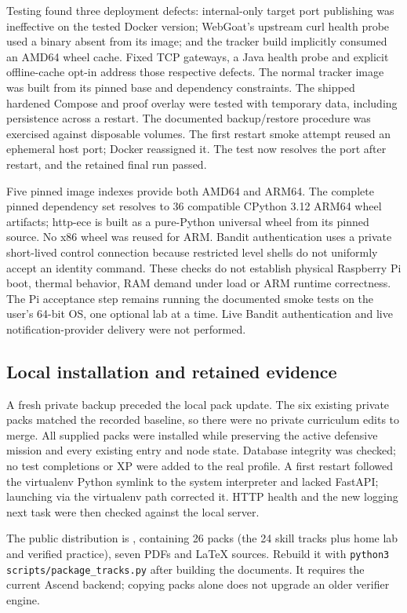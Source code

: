 Testing found three deployment defects: internal-only target port publishing was
ineffective on the tested Docker version; WebGoat's upstream curl health probe used
a binary absent from its image; and the tracker build implicitly consumed an AMD64
wheel cache. Fixed TCP gateways, a Java health probe and explicit offline-cache
opt-in address those respective defects. The normal tracker image was built from
its pinned base and dependency constraints. The shipped hardened Compose and proof
overlay were tested with temporary data, including persistence across a restart.
The documented backup/restore procedure was exercised against disposable volumes.
The first restart smoke attempt reused an ephemeral host port; Docker reassigned it.
The test now resolves the port after restart, and the retained final run passed.

Five pinned image indexes provide both AMD64 and ARM64. The complete pinned dependency
set resolves to 36 compatible CPython 3.12 ARM64 wheel artifacts; http-ece is built
as a pure-Python universal wheel from its pinned source. No x86 wheel was reused for
ARM. Bandit authentication uses a private short-lived control connection because
restricted level shells do not uniformly accept an identity command. These checks do not establish physical Raspberry Pi boot, thermal behavior,
RAM demand under load or ARM runtime correctness. The Pi acceptance step remains
running the documented smoke tests on the user's 64-bit OS, one optional lab at a time.
Live Bandit authentication and live notification-provider delivery were not performed.

\subsection{Local installation and retained evidence}
A fresh private backup preceded the local pack update. The six existing private
packs matched the recorded baseline, so there were no private curriculum edits to
merge. All supplied packs were installed while preserving the active defensive
mission and every existing entry and node state. Database integrity was checked;
no test completions or XP were added to the real profile. A first restart followed
the virtualenv Python symlink to the system interpreter and lacked FastAPI; launching
via the virtualenv path corrected it. HTTP health and the new logging next task were
then checked against the local server.

The public distribution is , containing 26 packs
(the 24 skill tracks plus home lab and verified practice), seven PDFs and LaTeX
sources. Rebuild it with \texttt{python3 scripts/package\_tracks.py} after building
the documents. It requires the current Ascend backend; copying packs alone does not
upgrade an older verifier engine.


